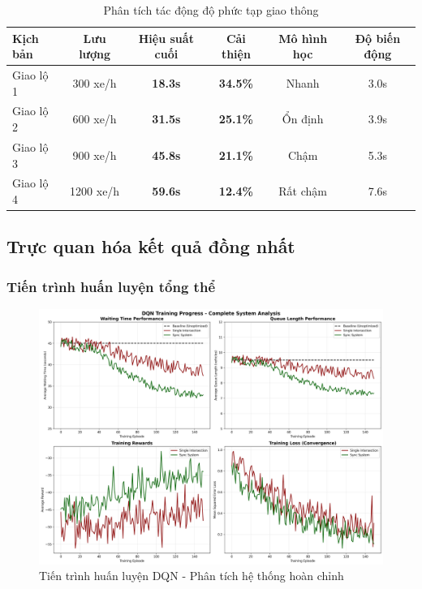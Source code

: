 \begin{table}[!htp]
    \centering
    \caption{Phân tích tác động độ phức tạp giao thông}
    \label{tab:traffic_complexity_analysis}
    \begin{tabular}{@{}lccccc@{}}
        \toprule 
        \textbf{Kịch bản} & \textbf{Lưu lượng} & \textbf{Hiệu suất cuối} & \textbf{Cải thiện} & \textbf{Mô hình học} & \textbf{Độ biến động} \\
        \midrule 
        Giao lộ 1 & 300 xe/h & \textbf{18.3s} & \textbf{34.5\%} & Nhanh & 3.0s \\
        Giao lộ 2 & 600 xe/h & \textbf{31.5s} & \textbf{25.1\%} & Ổn định & 3.9s \\
        Giao lộ 3 & 900 xe/h & \textbf{45.8s} & \textbf{21.1\%} & Chậm & 5.3s \\
        Giao lộ 4 & 1200 xe/h & \textbf{59.6s} & \textbf{12.4\%} & Rất chậm & 7.6s \\
        \bottomrule
    \end{tabular}
\end{table}

\subsection{Trực quan hóa kết quả đồng nhất}

\subsubsection{Tiến trình huấn luyện tổng thể}

\begin{figure}[!htp]
    \centering
    \includegraphics[width=\textwidth]{figures/01_training_progress.png}
    \caption{Tiến trình huấn luyện DQN - Phân tích hệ thống hoàn chỉnh}
    \label{fig:comprehensive_training_progress}
\end{figure}

